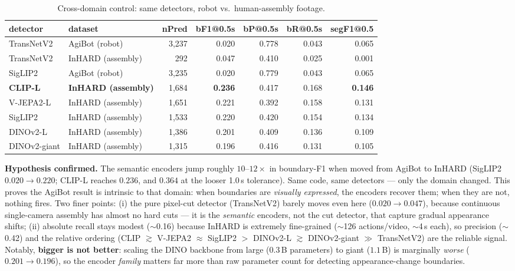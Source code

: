 \documentclass[10pt,letterpaper]{article}
\begin{document}
\begin{table}[H]
\centering
\caption{Cross-domain control: same detectors, robot vs.\ human-assembly footage.}
\begin{tabular}{llrrrrr}
\toprule
detector & dataset & nPred & bF1@0.5s & bP@0.5s & bR@0.5s & segF1@0.5 \\
\midrule
TransNetV2 & AgiBot (robot)     & 3{,}237 & 0.020 & 0.778 & 0.043 & 0.065 \\
TransNetV2 & InHARD (assembly)  & 292     & 0.047 & 0.410 & 0.025 & 0.001 \\
SigLIP2    & AgiBot (robot)     & 3{,}235 & 0.020 & 0.779 & 0.043 & 0.065 \\
\textbf{CLIP-L}   & \textbf{InHARD (assembly)} & 1{,}684 & \textbf{0.236} & 0.417 & 0.168 & \textbf{0.146} \\
V-JEPA2-L  & InHARD (assembly)  & 1{,}651 & 0.221 & 0.392 & 0.158 & 0.131 \\
SigLIP2    & InHARD (assembly)  & 1{,}533 & 0.220 & 0.420 & 0.154 & 0.134 \\
DINOv2-L   & InHARD (assembly)  & 1{,}386 & 0.201 & 0.409 & 0.136 & 0.109 \\
DINOv2-giant & InHARD (assembly) & 1{,}315 & 0.196 & 0.416 & 0.131 & 0.105 \\
\bottomrule
\end{tabular}
\end{table}

\textbf{Hypothesis confirmed.} The semantic encoders jump roughly $10$--$12\times$ in
boundary-F1 when moved from AgiBot to InHARD (SigLIP2 $0.020 \to 0.220$; CLIP-L reaches $0.236$,
and $0.364$ at the looser 1.0\,s tolerance). Same code, same detectors --- only the domain
changed. This proves the AgiBot result is intrinsic to that domain: when boundaries are
\emph{visually expressed}, the encoders recover them; when they are not, nothing fires. Two
finer points: (i) the pure pixel-cut detector (TransNetV2) barely moves even here
($0.020 \to 0.047$), because continuous single-camera assembly has almost no hard cuts --- it is
the \emph{semantic} encoders, not the cut detector, that capture gradual appearance shifts;
(ii) absolute recall stays modest ($\sim$0.16) because InHARD is extremely fine-grained
($\sim$126 actions/video, $\sim$4\,s each), so precision ($\sim$0.42) and the relative ordering
(CLIP $\gtrsim$ V-JEPA2 $\approx$ SigLIP2 $>$ DINOv2-L $\gtrsim$ DINOv2-giant $\gg$ TransNetV2) are
the reliable signal. Notably, \textbf{bigger is not better}: scaling the DINO backbone from large
($0.3$\,B parameters) to giant ($1.1$\,B) is marginally \emph{worse} ($0.201 \to 0.196$), so the
encoder \emph{family} matters far more than raw parameter count for detecting appearance-change
boundaries.
\end{document}
